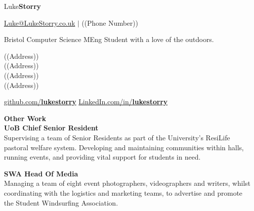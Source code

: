 \documentclass[10pt]{article}
\newcommand{\bold}[1]{\textbf{\textcolor{dark}{#1}}}
\newcommand{\sect}[1]{
\vspace{0.4em} {\LARGE\bold{#1}}\vspace{0.2em}\\}
\newcommand{\xx}[2]{{\large\bold{#1}}\\{#2}\vspace{0.5em}}
\begin{document}
\vspace{0.6em}

\begin{center}
{\color{dark}\Huge Luke\textbf{Storry}}
\hspace{0.1em}

{\large \href{mailto:Luke@LukeStorry.co.uk}{Luke@LukeStorry.co.uk}  $|$ ((Phone Number))} 

Bristol Computer Science MEng Student with a love of the outdoors.\\
\vspace{-0.5em}
{\color{dark}\hrulefill}
\end{center}




\hspace{-1.5em}
\begin{minipage}[t]{0.34\textwidth}
\raggedright

\vspace{0.5em}

((Address))\\((Address))\\((Address))\\((Address))

\vspace{0.5em}

\href{https://github.com/lukestorry}{github.com/\bold{\textcolor{dark}{lukestorry}}}
\href{https://www.linkedin.com/in/lukestorry}{LinkedIn.com/in/\bold{lukestorry}} \\

\vspace{1.5em}

\sect{Other Work}
\xx{UoB Chief Senior Resident}
{Supervising a team of Senior Residents as part of the University's ResiLife pastoral welfare system. Developing and maintaining communities within halls, running events, and providing vital support for students in need.
}

\xx{SWA Head Of Media}
{Managing a team of eight event photographers, videographers and writers, whilst coordinating with the logistics and marketing teams, to advertise and promote the Student Windsurfing Association.
}


\end{minipage}
\end{document}
